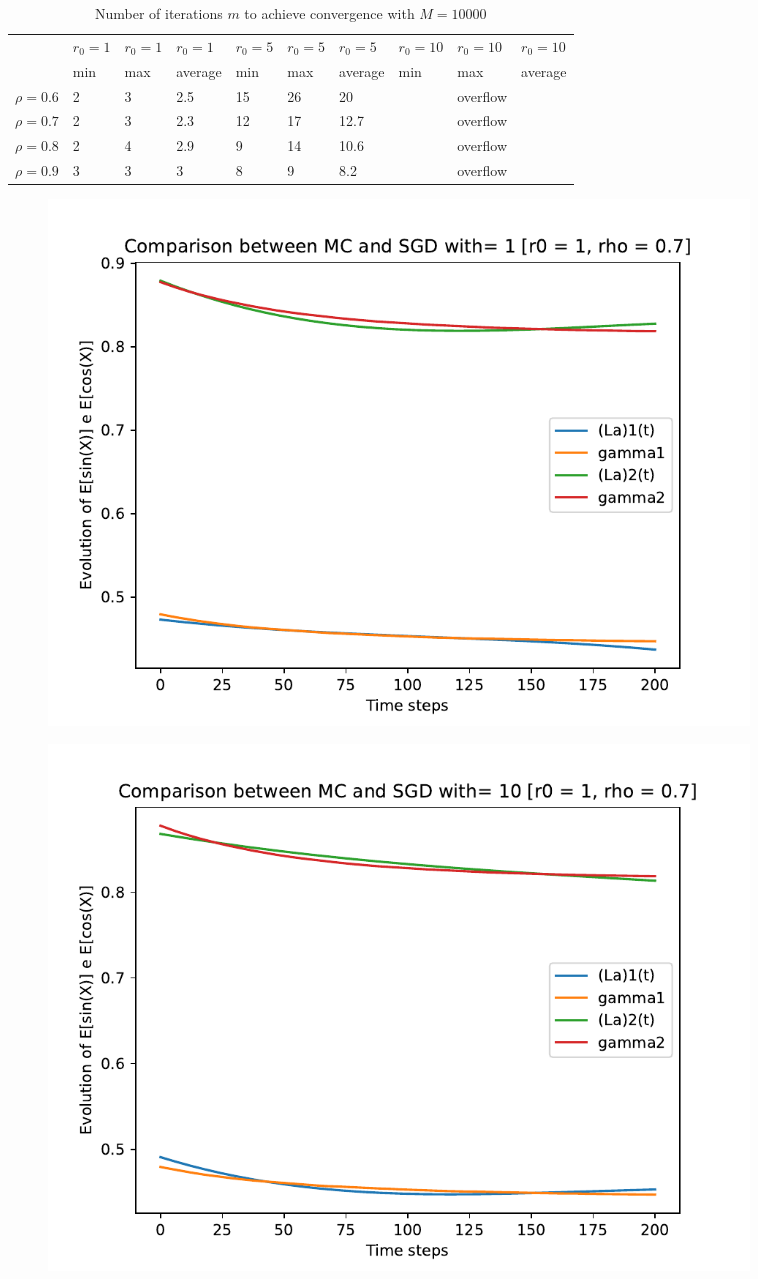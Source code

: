 \documentclass[a4paper,11pt,openright]{report}
\begin{document}
\begin{table}[H]
\centering
\addtolength{\leftskip}{-1.5cm}
\addtolength{\rightskip}{-1.5cm}
\begin{tabular}{|c|lllllllll|}
\hline
$ $ & $r_0 = 1$ & $r_0 = 1$ & $r_0 = 1$ & $r_0 = 5$ & $r_0 = 5$ & $r_0 = 5$ & $r_0 = 10$ & $r_0 = 10$ & $r_0 = 10$  \\
$ $ & min & max & average & min & max & average & min & max & average \\ 
\hline
$\rho = 0.6$ & 2 & 3 & 2.5 & 15 & 26 & 20 &  & overflow &  \\

$\rho = 0.7$ & 2 & 3 & 2.3 & 12 & 17 & 12.7 &  & overflow &  \\

$\rho = 0.8$ & 2 & 4 & 2.9 & 9 & 14 & 10.6 &  & overflow & \\

$\rho = 0.9$ & 3 & 3 & 3 & 8 & 9 & 8.2 &  & overflow & \\
\hline
\end{tabular}
\caption{Number of iterations $m$ to achieve convergence with $M = 10000$}
\end{table}
\begin{figure}[H]
\centering
\includegraphics[width=0.9\textwidth]{images/graphics T = 2/n = 3, M = 1 sine and cosine.pdf}
\end{figure}
\begin{figure}[H]
\centering
\includegraphics[width=0.9\textwidth]{images/graphics T = 2/n = 3, M = 10 sine and cosine.pdf}
\end{figure}
\end{document}
